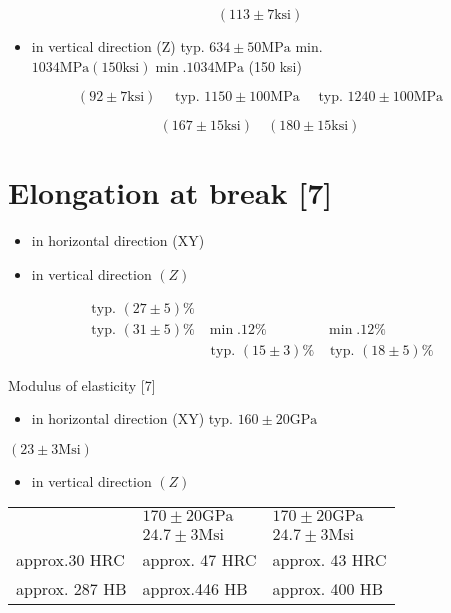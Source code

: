 \documentclass[10pt]{article}
\begin{document}
$$
(113 \pm 7 \mathrm{ksi})
$$

\begin{itemize}
  \item in vertical direction (Z) typ. $634 \pm 50 \mathrm{MPa}$ min. $1034 \mathrm{MPa}(150 \mathrm{ksi}) \min .1034 \mathrm{MPa}$ (150 ksi)
\end{itemize}

$$
(92 \pm 7 \mathrm{ksi}) \quad \text { typ. } 1150 \pm 100 \mathrm{MPa} \quad \text { typ. } 1240 \pm 100 \mathrm{MPa}
$$

$$
(167 \pm 15 \mathrm{ksi}) \quad(180 \pm 15 \mathrm{ksi})
$$

\section*{Elongation at break [7]}
\begin{itemize}
  \item in horizontal direction (XY)
  \item in vertical direction $(Z)$
\end{itemize}

$$
\begin{array}{ccc}
\text { typ. }(27 \pm 5) \% & & \\
\hline \text { typ. }(31 \pm 5) \% & \min .12 \% & \min .12 \% \\
& \text { typ. }(15 \pm 3) \% & \text { typ. }(18 \pm 5) \%
\end{array}
$$

Modulus of elasticity [7]

\begin{itemize}
  \item in horizontal direction (XY) typ. $160 \pm 20 \mathrm{GPa}$
\end{itemize}

$(23 \pm 3 \mathrm{Msi})$

\begin{itemize}
  \item in vertical direction $(Z)$
\end{itemize}

\begin{center}
\begin{tabular}{lll}
\hline
 & $170 \pm 20 \mathrm{GPa}$ & $170 \pm 20 \mathrm{GPa}$ \\
 & $24.7 \pm 3 \mathrm{Msi}$ & $24.7 \pm 3 \mathrm{Msi}$ \\
\hline
approx.30 HRC & approx. 47 HRC & approx. 43 HRC \\
approx. 287 HB & approx.446 HB & approx. 400 HB \\
\hline
\end{tabular}
\end{center}
\end{document}
